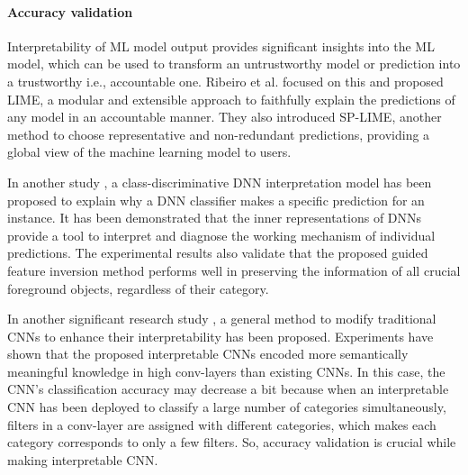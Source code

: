 \paragraph{\textbf{Accuracy validation}}
Interpretability of ML model output provides significant insights into the ML model, which can be used to transform an untrustworthy model or prediction into a trustworthy i.e., accountable one. Ribeiro et al. \cite{ribeiro2016should} focused on this and proposed LIME, a modular and extensible approach to faithfully explain the predictions of any model in an accountable manner. They also introduced SP-LIME, another method to choose representative and non-redundant predictions, providing a global view of the machine learning model to users.

In another study \cite{du2018towards}, a class-discriminative DNN interpretation model has been proposed to explain why a DNN classifier makes a specific prediction for an instance. It has been demonstrated that the inner representations of DNNs provide a tool to interpret and diagnose the working mechanism of individual predictions. The experimental results also validate that the proposed guided feature inversion method performs well in preserving the information of all crucial foreground objects, regardless of their category.

In another significant research study \cite{zhang2018interpretable}, a general method to modify traditional CNNs to enhance their interpretability has been proposed. Experiments have shown that the proposed interpretable CNNs encoded more semantically meaningful knowledge in high conv-layers than existing CNNs. In this case, the CNN’s classification accuracy may decrease a bit because when an interpretable CNN has been deployed to classify a large number of categories simultaneously, filters in a conv-layer are assigned with different categories, which makes each category corresponds to only a few filters. So, accuracy validation is crucial while making interpretable CNN.
